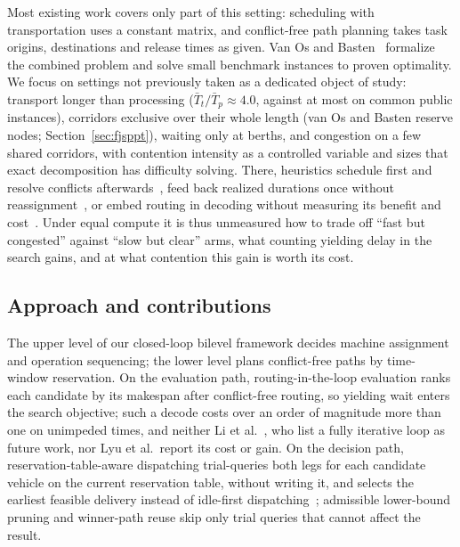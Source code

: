 Most existing work covers only part of this setting: scheduling with transportation uses a constant matrix, and conflict-free path planning takes task origins, destinations and release times as given.
Van Os and Basten~\cite{vanos2026exact} formalize the combined problem and solve small benchmark instances to proven optimality.
We focus on settings not previously taken as a dedicated object of study: transport longer than processing ($\bar{T}_t/\bar{T}_p\approx4.0$, against at most \PubTtTpHi{} on common public instances), corridors exclusive over their whole length (van Os and Basten reserve nodes; Section~\ref{sec:fjsppt}), waiting only at berths, and congestion on a few shared corridors, with contention intensity as a controlled variable and sizes that exact decomposition has difficulty solving.
There, heuristics schedule first and resolve conflicts afterwards~\cite{sun2023integrated}, feed back realized durations once without reassignment~\cite{li2026framework}, or embed routing in decoding without measuring its benefit and cost~\cite{lyu2019approach}.
Under equal compute it is thus unmeasured how to trade off ``fast but congested'' against ``slow but clear'' arms, what counting yielding delay in the search gains, and at what contention this gain is worth its cost.

\subsection{Approach and contributions}

The upper level of our closed-loop bilevel framework decides machine assignment and operation sequencing; the lower level plans conflict-free paths by time-window reservation.
On the evaluation path, routing-in-the-loop evaluation ranks each candidate by its makespan after conflict-free routing, so yielding wait enters the search objective; such a decode costs over an order of magnitude more than one on unimpeded times, and neither Li et al.~\cite{li2026framework}, who list a fully iterative loop as future work, nor Lyu et al.\ report its cost or gain.
On the decision path, reservation-table-aware dispatching trial-queries both legs for each candidate vehicle on the current reservation table, without writing it, and selects the earliest feasible delivery instead of idle-first dispatching~\cite{lu2022agv}; admissible lower-bound pruning and winner-path reuse skip only trial queries that cannot affect the result.

